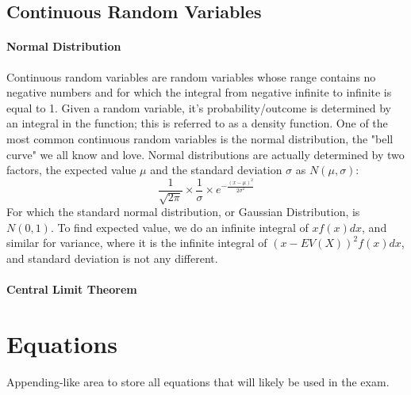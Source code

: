 \subsection{Continuous Random Variables}
\paragraph{Normal Distribution} Continuous random variables are random variables whose range contains no negative numbers and for which the integral from negative infinite to infinite is equal to 1. Given a random variable, it's probability/outcome is determined by an integral in the function; this is referred to as a density function. One of the most common continuous random variables is the normal distribution, the "bell curve" we all know and love. Normal distributions are actually determined by two factors, the expected value $\mu$ and the standard deviation $\sigma$ as $N(\mu, \sigma)$: 
\[
\frac{1}{\sqrt{2\pi}}\times \frac{1}{\sigma} \times e^{-\frac{(x-\mu)^2}{2\sigma^2}}\] 
For which the standard normal distribution, or Gaussian Distribution, is $N(0,1)$. To find expected value, we do an infinite integral of $x f(x) dx$, and similar for variance, where it is the infinite integral of $(x - EV(X))^2f(x)dx$, and standard deviation is not any different.
\paragraph{Central Limit Theorem} 
\section{Equations}
Appending-like area to store all equations that will likely be used in the exam.
